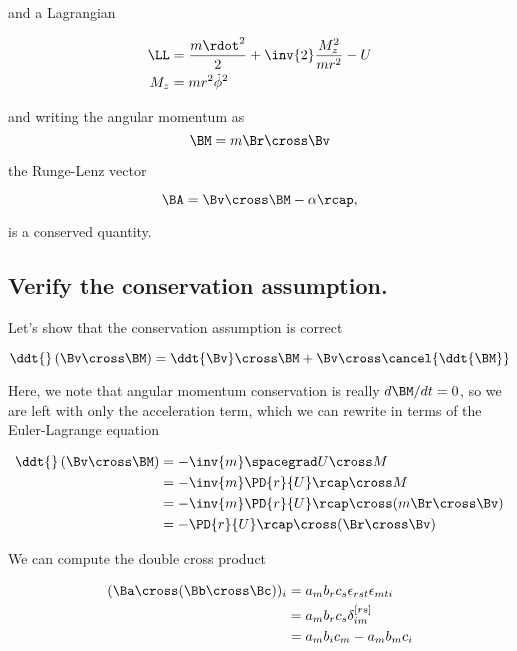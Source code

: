 and a Lagrangian

\begin{align}\label{eqn:RungeLenz:50}
\LL &= \frac{m \rdot^2}{2} + \inv{2} \frac{M_z^2}{m r^2} - U \\
M_z &= m r^2 \dot{\phi}^2
\end{align}

and writing the angular momentum as
\begin{equation}\label{eqn:RungeLenz:70}
\BM = m \Br \cross \Bv %
\end{equation}

the Runge-Lenz vector

\begin{equation}\label{eqn:RungeLenz:90}
\BA = \Bv \cross \BM - \alpha \rcap,
\end{equation}

is a conserved quantity.

\subsection{Verify the conservation assumption.}

Let's show that the conservation assumption is correct

\begin{equation}\label{eqn:RungeLenz:110}
\ddt{} \left( \Bv \cross \BM \right)
=
\ddt{ \Bv} \cross \BM 
+ \Bv \cross \cancel{\ddt{\BM }}
\end{equation}

Here, we note that angular momentum conservation is really $d\BM/dt = 0$, so we are left with only the acceleration term, which we can rewrite in terms of the Euler-Lagrange equation

\begin{align*}
\ddt{} \left( \Bv \cross \BM \right)
&=
-\inv{m} \spacegrad U \cross M \\
&=
-\inv{m} \PD{r}{U} \rcap \cross M \\
&=
-\inv{m} \PD{r}{U} \rcap \cross (m \Br \cross \Bv) \\
&=
- \PD{r}{U} \rcap \cross (\Br \cross \Bv) 
\end{align*}

We can compute the double cross product

\begin{align*}
(\Ba \cross (\Bb \cross \Bc) )_i
&=
a_m b_r c_s \epsilon_{r s t} \epsilon_{m t i} \\
&=
a_m b_r c_s \delta^{[rs]}_{i m} \\
&=
a_m b_i c_m 
-a_m b_m c_i 
\end{align*}


